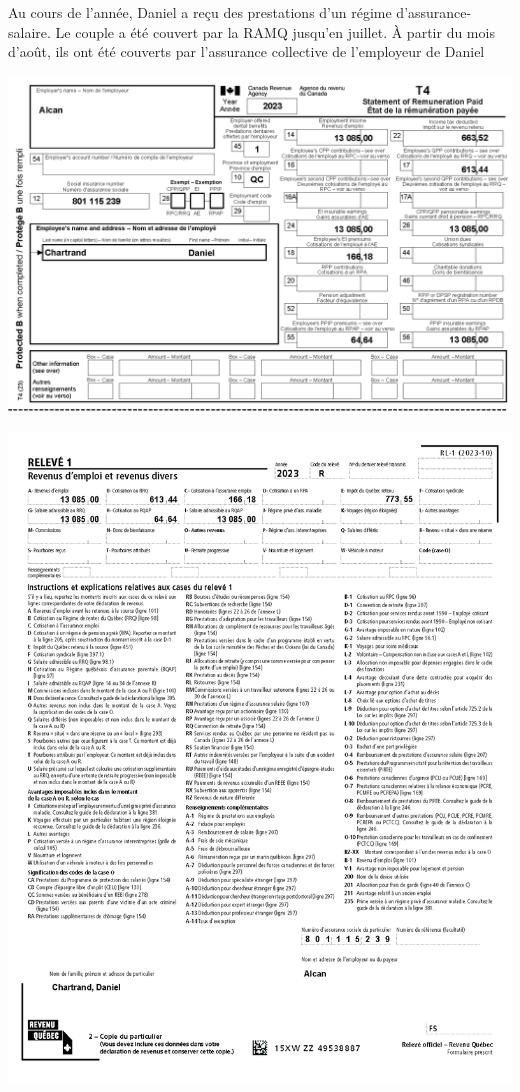 Au cours de l'année, Daniel a reçu des prestations d'un régime d'assurance-salaire. Le couple a été couvert par la RAMQ jusqu'en juillet. À partir du mois d'août, ils ont été couverts par l'assurance collective de l'employeur de Daniel

\noindent
\includegraphics[width=\textwidth]{probleme/chapitre-2/T4-Alcan.png}

\noindent
\includegraphics[width=\textwidth]{probleme/chapitre-2/RL1-Alcan.png}

